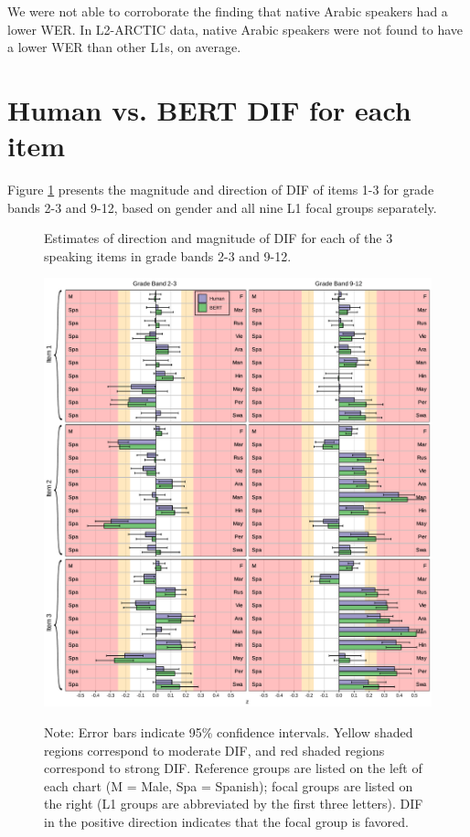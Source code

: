 \documentclass [PhD] {uclathes}
\begin{document}
We were not able to corroborate the finding that native Arabic speakers had a lower WER. In L2-ARCTIC data, native Arabic speakers were not found to have a lower WER than other L1s, on average. 

\section{Human vs. BERT DIF for each item}
\label{sec:appendix_z_itm}

Figure \ref{fig:z_itm} presents the magnitude and direction of DIF of items 1-3 for grade bands 2-3 and 9-12, based on gender and all nine L1 focal groups separately.

\begin{figure}[t]
    \centering
    \caption{Estimates of direction and magnitude of DIF for each of the 3 speaking items in grade bands 2-3 and 9-12.}
    \includegraphics[width=6in]{figures/20230504_ETS-DIF_BERT_z_itm_edit.pdf}
    \label{fig:z_itm}
\caption*{\small Note: Error bars indicate 95\% confidence intervals. Yellow shaded regions correspond to moderate DIF, and red shaded regions correspond to strong DIF. Reference groups are listed on the left of each chart (M = Male, Spa = Spanish); focal groups are listed on the right (L1 groups are abbreviated by the first three letters). DIF in the positive direction indicates that the focal group is favored.}
\end{figure}


%
%
%

\end{document}
